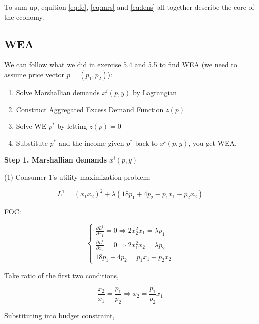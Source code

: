 \documentclass{article}
\begin{document}
To sum up, equition \ref{eq:fe}, \ref{eq:mrs} and \ref{eq:lens} all together  describe the core of the economy.

\subsection{WEA}

\begin{mdframed}[backgroundcolor=blue!20,linecolor=white]

We can follow what we did in exercise 5.4 and 5.5 to find WEA
(we need to assume price vector $p=(p_1,p_2)$):

\begin{enumerate}
\item Solve Marshallian demands $x^i(p,y)$ by Lagrangian
\item Construct Aggregated Excess Demand Function $z(p)$ 
\item Solve WE $p^*$ by letting $z(p) = 0$
\item Substitute $p^*$ and the income given $p^*$ back to $x^i(p,y)$, you get WEA.
\end{enumerate}
\end{mdframed}

\vspace{3mm}

\textbf{Step 1. Marshallian demands $x^i(p,y)$}

\vspace{3mm}

(1) Consumer 1's utility maximization problem:

$$L^1 = (x_1x_2)^2 + \lambda (18p_1 +4p_2 - p_1x_1 -p_2x_2) $$

FOC:

\begin{equation}
    \begin{cases}
\frac{\partial L^1}{\partial x_1} = 0  \Rightarrow 2x_2^2x_1 = \lambda p_1 \\
\frac{\partial L^1}{\partial x_2} = 0  \Rightarrow 2x_1^2x_2 = \lambda p_2 \\
18p_1 +4p_2 = p_1x_1 + p_2x_2
    \end{cases}
    \nonumber
\end{equation}

Take ratio of the first two conditions,

$$\frac{x_2}{x_1} = \frac{p_1}{p_2} \Rightarrow x_2 = \frac{p_1}{p_2}  x_1$$

Substituting into budget constraint,
\end{document}
